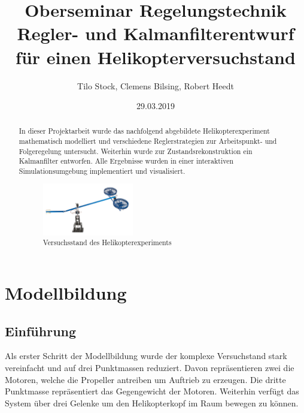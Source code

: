 \documentclass[times, 9pt,twocolumn]{article}
\begin{document}
	\title{Oberseminar Regelungstechnik \\ Regler- und Kalmanfilterentwurf f\"ur einen 					Helikopterversuchstand}
	\author{Tilo Stock, Clemens Bilsing, Robert Heedt}
	\date {29.03.2019}

	\maketitle
	\thispagestyle{empty}
	
	\renewcommand\abstractname{Zusammenfassung}
	\begin{abstract}
		In dieser Projektarbeit wurde das nachfolgend abgebildete Helikopterexperiment mathematisch modelliert und verschiedene Reglerstrategien zur Arbeitspunkt- und Folgeregelung untersucht.
		Weiterhin wurde zur Zustandsrekonstruktion ein Kalmanfilter entworfen. Alle Ergebnisse wurden in einer interaktiven Simulationsumgebung implementiert und visualisiert.

		\begin{figure}[ht]
			\centering
			\includegraphics[width=0.4\textwidth]{images/Versuchstand}
			\caption{Versuchsstand des Helikopterexperiments}
			\label{Versuchstand}
		\end{figure}
	\end{abstract}
	
	\section{Modellbildung}
	\subsection{Einführung}

	Als erster Schritt der Modellbildung wurde der komplexe Versuchstand stark vereinfacht und auf drei Punktmassen reduziert. Davon repräsentieren zwei die Motoren, welche die Propeller antreiben um Auftrieb zu erzeugen. Die dritte Punktmasse repräsentiert das Gegengewicht der Motoren. Weiterhin verfügt das System über drei Gelenke um den Helikopterkopf im Raum bewegen zu können.
\end{document}
